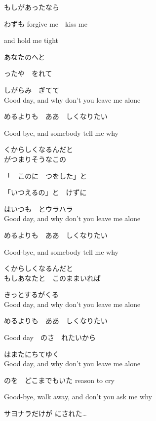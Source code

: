 \large{

もしがあったなら

わずも forgive me　kiss me

and hold me tight

あなたのへと

ったや　をれて

しがらみ　ぎてて
\\

Good day, and why don't you leave me alone

めるよりも　ああ　しくなりたい

Good-bye, and somebody tell me why

くからしくなるんだと
\\

がつまりそうなこの

「　このに　つをした」と

「いつえるの」と　けずに

はいつも　とウラハラ
\\

Good day, and why don't you leave me alone

めるよりも　ああ　しくなりたい

Good-bye, and somebody tell me why

くからしくなるんだと
\\

もしあなたと　このままいれば

きっとするがくる
\\

Good day, and why don't you leave me alone

めるよりも　ああ　しくなりたい

Good day　のさ　れたいから

はまたにちてゆく
\\

Good day, and why don't you leave me alone

のを　どこまでもいた reason to cry

Good-bye, walk away, and don't you ask me why

サヨナラだけが にされた…

}